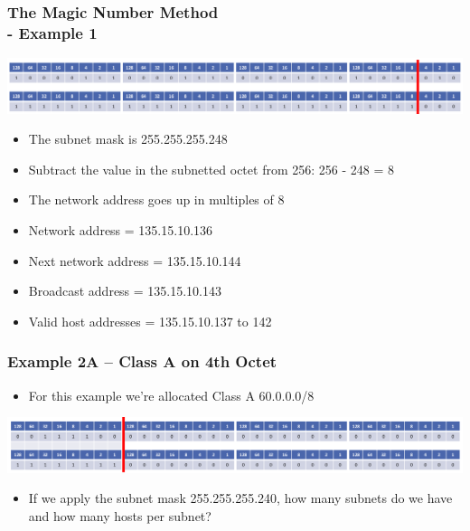\documentclass[pdflatex,compress]{beamer}
\begin{document}
\begin{frame}
	\frametitle{The Magic Number Method\\ - Example 1}
	\begin{center}
		\includegraphics[width=\linewidth]{img/img18}
	\end{center}
	\begin{itemize}
		\item The subnet mask is 255.255.255.248
		\item Subtract the value in the subnetted octet from 256: 256 - 248 = 8
		\item The network address goes up in multiples of 8
		\item Network address = 135.15.10.136
		\item Next network address = 135.15.10.144
		\item Broadcast address = 135.15.10.143
		\item Valid host addresses = 135.15.10.137 to 142
	\end{itemize}
\end{frame}

\begin{frame}
	\frametitle{Example 2A – Class A on 4th Octet}
	\begin{itemize}
		\item For this example we’re allocated Class A 60.0.0.0/8
	\end{itemize}
	\begin{center}
		\includegraphics[width=\linewidth]{img/img19}
	\end{center}
	\begin{itemize}
		\item If we apply the subnet mask 255.255.255.240, how many subnets do we have and how many hosts per subnet?
	\end{itemize}
\end{frame}
\end{document}
